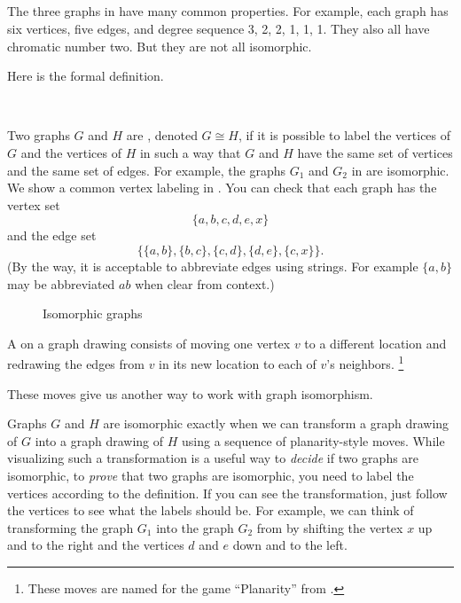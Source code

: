 \subsection{\subisograph}
\label{sub_isomorphic_graphs}

The three graphs in  have many common properties.  For example, each graph has six vertices, five edges, and degree sequence 3, 2, 2, 1, 1, 1. They also all have chromatic number two.  But they are not all isomorphic.  

Here is the formal definition.

\begin{defn}
\label{defn_ism_graphs}
~    
    \begin{apart} 
        \item Two graphs $G$ and $H$ are , denoted $G \cong H$, if it is possible to label the vertices of $G$ and the vertices of $H$ in such a way that $G$ and $H$ have the same set of vertices and the same set of edges. For example, the graphs $G_1$ and $G_2$ in  are isomorphic.  We show a common vertex labeling in .  You can check that each graph has the vertex set
            $$\{a, b, c, d, e, x\}$$
        and the edge set 
            $$ \{\{a,b\}, \{b,c\}, \{c,d\}, \{d,e\}, \{c,x\}\}.$$
        (By the way, it is acceptable to abbreviate edges using strings.  For example $\{a,b\}$ may be abbreviated $ab$ when clear from context.)
            \begin{figure}[hbtp]
                \centering
                
                \caption{Isomorphic graphs}
                \label{fig_G1G2_labeled}
            \end{figure}      
        \item A  on a graph drawing consists of moving one vertex $v$ to a different location and redrawing the edges from $v$ in its new location to each of $v$'s neighbors. \footnote{These moves are named for the game ``Planarity'' from .} 
    \end{apart}
\end{defn}

These moves give us another way to work with graph isomorphism.

\begin{rem}
\label{rem_planarity_moves}
    Graphs $G$ and $H$ are isomorphic exactly when we can transform a graph drawing of $G$ into a graph drawing of $H$ using a sequence of planarity-style moves. While visualizing such a transformation is a useful way to \emph{decide} if two graphs are isomorphic, to \emph{prove} that two graphs are isomorphic, you need to label the vertices according to the definition.  If you can see the transformation, just follow the vertices to see what the labels should be. For example, we can think of transforming the graph $G_1$ into the graph $G_2$ from  by shifting the vertex $x$ up and to the right and the vertices $d$ and $e$ down and to the left.
\end{rem}
 
